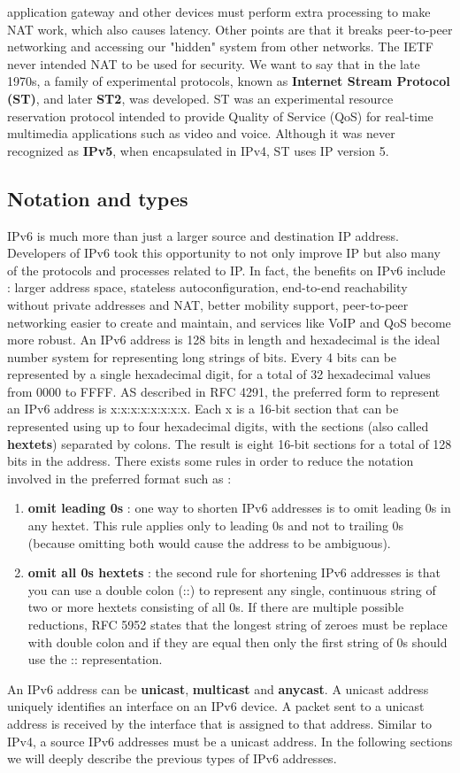 \documentclass[11pt]{article}
\begin{document}
application gateway and other devices must perform extra processing to make NAT work, which also causes latency. Other points are that it breaks peer-to-peer networking and accessing our "hidden" system from other networks. The IETF never intended NAT to be used for security. We want to say that in the late 1970s, a family of experimental protocols, known as \textbf{Internet Stream Protocol (ST)}, and later \textbf{ST2}, was developed. ST was an experimental resource reservation protocol intended to provide Quality of Service (QoS) for real-time multimedia applications such as video and voice. Although it was never recognized as \textbf{IPv5}, when encapsulated in IPv4, ST uses IP version 5. 
\subsection{Notation and types}
IPv6 is much more than just a larger source and destination IP address. Developers of IPv6 took this opportunity to not only improve IP but also many of the protocols and processes related to IP. In fact, the benefits on IPv6 include : larger address space, stateless autoconfiguration, end-to-end reachability without private addresses and NAT, better mobility support, peer-to-peer networking easier to create and maintain, and services like VoIP and QoS become more robust. An IPv6 address is 128 bits in length and hexadecimal is the ideal number system for representing long strings of bits. Every 4 bits can be represented by a single hexadecimal  digit, for a total of 32 hexadecimal values from 0000 to FFFF. AS described in RFC 4291, the preferred form to represent an IPv6 address is x:x:x:x:x:x:x:x. Each x is a 16-bit section that can be represented using up to four hexadecimal digits, with the sections (also called \textbf{hextets}) separated by colons. The result is eight 16-bit sections for a total of 128 bits in the address. There exists some rules in order to reduce the notation involved in the preferred format such as :
\begin{enumerate}
\item \textbf{omit leading 0s} : one way to shorten IPv6 addresses is to omit leading 0s in any hextet. This rule applies only to leading 0s and not to trailing 0s (because omitting both would cause the address to be ambiguous).
\item \textbf{omit all 0s hextets} : the second rule for shortening IPv6 addresses is that you can use a double  colon (::) to represent any single, continuous string of two or more hextets consisting of all 0s. If there are multiple possible reductions, RFC 5952 states that the longest string of zeroes must be replace with double colon and if they are equal then only the first string of 0s should use the :: representation.
\end{enumerate}
An IPv6 address can be \textbf{unicast}, \textbf{multicast} and \textbf{anycast}. A unicast address uniquely identifies an interface on an IPv6 device. A packet sent to a unicast address is received by the interface that is assigned to that address. Similar to IPv4, a source IPv6 addresses must be a unicast address. In the following sections we will deeply describe the previous types of IPv6 addresses.
\end{document}
